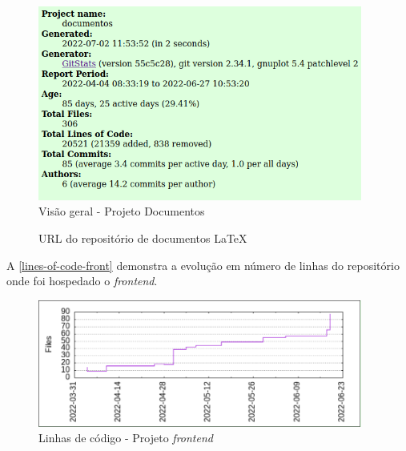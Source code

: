 \begin{figure}[H]
	\centering
	\caption{\label{overview-doc}Visão geral - Projeto Documentos}
	\includegraphics[width=0.95\textwidth]{../imagens/stats/overview-documentos.png}
\end{figure}

\begin{figure}[htb]
	\caption{\label{qr-url-doc}URL do repositório de documentos \LaTeX}
	\begin{center}
	\end{center}
\end{figure}

A \autoref{lines-of-code-front} demonstra a evolução em número de linhas do repositório onde foi hospedado o \textit{\gls{frontend}}.
\begin{figure}[H]
	\centering
	\caption{\label{lines-of-code-front}Linhas de código - Projeto \textit{\gls{frontend}}}
	\includegraphics[width=0.95\textwidth]{../imagens/stats/lines-of-code-frontend.png}
\end{figure}


